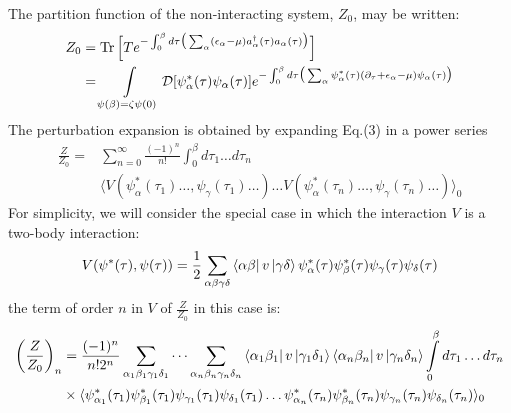 \documentclass[12pt]{article}
\begin{document}
The partition function of the non-interacting system, $Z_0$, may be written:
\begin{equation*}
    \begin{split}
        Z_0&=\Tr\Big[T e^{-\int_0^\beta d\tau\big(\sum_\alpha(\epsilon_\alpha-\mu)
        a^\dagger_\alpha(\tau)a_\alpha(\tau)\big)}\Big]\\
        &=\int\limits_{\psi(\beta)=\zeta\psi(0)}\mathcal{D}[\psi^*_\alpha(\tau)
        \psi_\alpha(\tau)]e^{-\int_0^\beta d\tau\big(\sum_\alpha\psi^*_\alpha(\tau)
        (\partial_\tau+\epsilon_\alpha-\mu)\psi_\alpha(\tau)\big)}
    \end{split}
\end{equation*}
The perturbation expansion is obtained by expanding Eq.(3) in a power series
\begin{equation*}
    \begin{split}
        \frac{Z}{Z_0}=&\sum_{n=0}^\infty\frac{(-1)^n}{n!}\int_0^\beta d\tau_1\dots 
        d\tau_n\\
        &\langle V(\psi^*_\alpha(\tau_1)\dots,\psi_\gamma(\tau_1)\dots)\dots
        V(\psi^*_\alpha(\tau_n)\dots,\psi_\gamma(\tau_n)\dots)\rangle_0
    \end{split}
\end{equation*}
For simplicity, we will consider the special case in which the interaction $V$ is 
a two-body interaction:
\begin{equation*}
    V(\psi^*(\tau),\psi(\tau))=\frac{1}{2}\sum_{\alpha\beta\gamma\delta}
    \bra{\alpha\beta}v\ket{\gamma\delta}\psi^*_\alpha(\tau)\psi^*_\beta(\tau)
    \psi_\gamma(\tau)\psi_\delta(\tau)
\end{equation*}
the term of order $n$ in $V$ of $\frac{Z}{Z_0}$ in this case is:
\begin{equation}
    \begin{split}
        \left(\frac{Z}{Z_0}\right)_n&=\frac{(-1)^n}{n!2^n}\sum_{\alpha_1\beta_1
        \gamma_1\delta_1}\dots\sum_{\alpha_n\beta_n\gamma_n\delta_n}
        \bra{\alpha_1\beta_1}v\ket{\gamma_1\delta_1}\bra{\alpha_n\beta_n}
        v\ket{\gamma_n\delta_n}\int\limits_0^\beta d\tau_1\dots d\tau_n\\
        &\times\langle\psi^*_{\alpha_1}(\tau_1)\psi^*_{\beta_1}(\tau_1)
        \psi_{\gamma_1}(\tau_1)\psi_{\delta_1}(\tau_1)\dots\psi^*_{\alpha_n}
        (\tau_n)\psi^*_{\beta_n}(\tau_n)\psi_{\gamma_n}(\tau_n)\psi_{\delta_n}
        (\tau_n)\rangle_0
    \end{split}
\end{equation}
\end{document}
